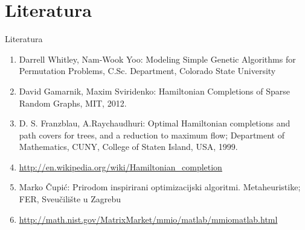\documentclass{beamer}
\begin{document}
\section{Literatura}
\begin{frame}{Literatura}
\tiny
\begin{enumerate}
\item Darrell Whitley, Nam-Wook Yoo: Modeling Simple Genetic Algorithms for Permutation Problems, C.Sc. Department, Colorado State University
\item David Gamarnik, Maxim Sviridenko: Hamiltonian Completions of Sparse Random Graphs, MIT, 2012.
\item D. S. Franzblau, A.Raychaudhuri: Optimal Hamiltonian completions and path covers for trees, and a reduction to maximum flow; Department of Mathematics, CUNY, College of Staten Island, USA, 1999.
\item \url{http://en.wikipedia.org/wiki/Hamiltonian_completion}
\item Marko \v{C}upi\'{c}: Prirodom inspirirani optimizacijski algoritmi. Metaheuristike; FER, Sveu\v{c}ili\v{s}te u Zagrebu
\item \url{http://math.nist.gov/MatrixMarket/mmio/matlab/mmiomatlab.html}

\end{enumerate}

\end{frame}
\end{document}
